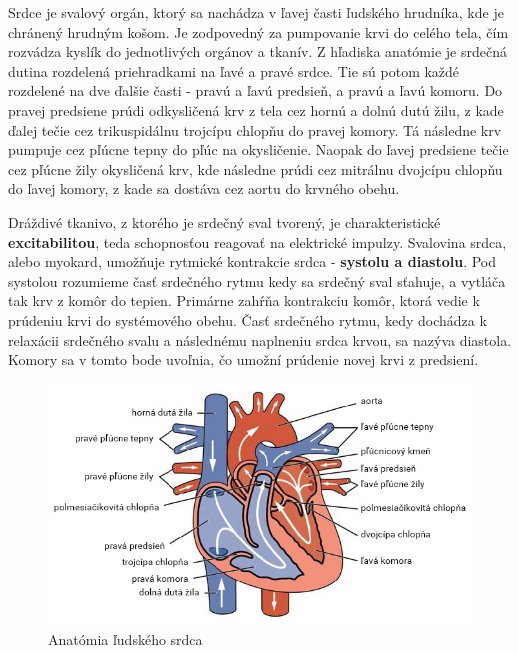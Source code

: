 Srdce je svalový orgán, ktorý sa nachádza v ľavej časti ľudského hrudníka, kde je chránený hrudným košom. Je zodpovedný za pumpovanie krvi do celého tela, čím rozvádza kyslík do jednotlivých orgánov a tkanív. Z hľadiska anatómie je srdečná dutina rozdelená priehradkami na ľavé a pravé srdce. Tie sú potom každé rozdelené na dve ďalšie časti - pravú a ľavú predsieň, a pravú a ľavú komoru. Do pravej predsiene prúdi odkysličená krv z tela cez hornú a dolnú dutú žilu, z kade ďalej tečie cez trikuspidálnu trojcípu chlopňu do pravej komory. Tá následne krv pumpuje cez pľúcne tepny do pľúc na okysličenie. Naopak do ľavej predsiene tečie cez pľúcne žily okysličená krv, kde následne prúdi cez mitrálnu dvojcípu chlopňu do ľavej komory, z kade sa dostáva cez aortu do krvného obehu.\cite{Weinhaus}\cite{Britannica_2024}

Dráždivé tkanivo, z ktorého je srdečný sval tvorený, je charakteristické \textbf{excitabilitou}, teda schopnosťou reagovať na elektrické impulzy. Svalovina srdca, alebo myokard, umožňuje rytmické kontrakcie srdca - \textbf{systolu a diastolu}. Pod systolou rozumieme časť srdečného rytmu kedy sa srdečný sval sťahuje, a vytláča tak krv z komôr do tepien. Primárne zahŕňa kontrakciu komôr, ktorá vedie k prúdeniu krvi do systémového obehu. Časť srdečného rytmu, kedy dochádza k relaxácii srdečného svalu a následnému naplneniu srdca krvou, sa nazýva diastola. Komory sa v tomto bode uvoľnia, čo umožní prúdenie novej krvi z predsiení.\cite{Weinhaus}

\begin{figure}[t]
    \centering
    \includegraphics[scale=0.6]{img/srdce.jpg}
    \caption{Anatómia ľudského srdca\cite{Pančík_2016}}
\end{figure}

